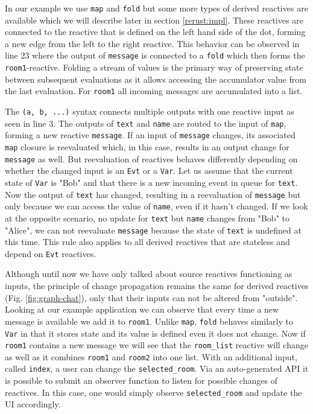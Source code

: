 In our example we use \lstinline{map} and \lstinline{fold} but some more types of derived reactives are available which we will describe later in section \ref{rerust:impl}. These reactives are connected to the reactive that is defined on the left hand side of the dot, forming a new edge from the left to the right reactive. This behavior can be observed in line 23 where the output of \lstinline{message} is connected to a \lstinline{fold} which then forms the \lstinline{room1}-reactive. Folding a stream of values is the primary way of preserving state between subsequent evaluations as it allows accessing the accumulator value from the last evaluation. For \lstinline{room1} all incoming messages are accumulated into a list.

The \lstinline{(a, b, ...)} syntax connects multiple outputs with one reactive input as seen in line 3. The outputs of \lstinline{text} and \lstinline{name} are routed to the input of \lstinline{map}, forming a new reactive \mbox{\lstinline{message}.} If an input of \lstinline{message} changes, its associated \lstinline{map} closure is reevaluated which, in this case, results in an output change for \lstinline{message} as well. But reevaluation of reactives behaves differently depending on whether the changed input is an \lstinline{Evt} or a \lstinline{Var}. Let us assume that the current state of \lstinline{Var} is "Bob" and that there is a new incoming event in queue for \lstinline{text}. Now the output of \lstinline{text} has changed, resulting in a reevaluation of \lstinline{message} but only because we can access the value of \lstinline{name}, even if it hasn't changed. If we look at the opposite scenario, no update for \lstinline{text} but \lstinline{name} changes from "Bob" to "Alice", we can not reevaluate \lstinline{message} because the state of \lstinline{text} is undefined at this time. This rule also applies to all derived reactives that are stateless and depend on \lstinline{Evt} reactives.

Although until now we have only talked about source reactives functioning as inputs, the principle of change propagation remains the same for derived reactives (Fig. \ref{fig:graph-chat}), only that their inputs can not be altered from "outside". Looking at our example application we can observe that every time a new message is available we add it to \lstinline{room1}. Unlike \lstinline{map}, \lstinline{fold} behaves similarly to \lstinline{Var} in that it stores state and its value is defined even it does not change. Now if \lstinline{room1} contains a new message we will see that the \lstinline{room_list} reactive will change as well as it combines \lstinline{room1} and \lstinline{room2} into one list. With an additional input, called \lstinline{index}, a user can change the \lstinline{selected_room}. Via an auto-generated \ac{API} it is possible to submit an observer function to listen for possible changes of reactives. In this case, one would simply observe \lstinline{selected_room} and update the \ac{UI} accordingly.

